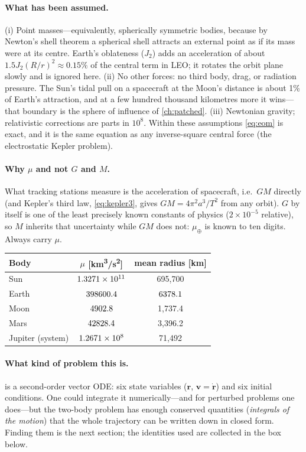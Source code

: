 \documentclass[11pt,letterpaper,oneside]{report}
\newcommand{\bv}[1]{\bm{#1}}
\begin{document}
\paragraph{What has been assumed.} (i) Point masses---equivalently, spherically symmetric bodies,
because by Newton's shell theorem a spherical shell attracts an external point as if its mass were
at its centre. Earth's oblateness ($J_2$) adds an acceleration of about $1.5J_2(R/r)^2\approx0.15\%$
of the central term in LEO; it rotates the orbit plane slowly and is ignored here. (ii) No other
forces: no third body, drag, or radiation pressure. The Sun's tidal pull on a spacecraft at the
Moon's distance is about 1\% of Earth's attraction, and at a few hundred thousand kilometres more
it wins---that boundary is the sphere of influence of \cref{ch:patched}. (iii) Newtonian gravity;
relativistic corrections are parts in $10^8$. Within these assumptions \cref{eq:eom} is exact, and
it is the same equation as any inverse-square central force (the electrostatic Kepler problem).

\paragraph{Why $\mu$ and not $G$ and $M$.} What tracking stations measure is the acceleration of
spacecraft, i.e.\ $GM$ directly (and Kepler's third law, \cref{eq:kepler3}, gives $GM=4\pi^2a^3/T^2$
from any orbit). $G$ by itself is one of the least precisely known constants of physics
($2\times10^{-5}$ relative), so $M$ inherits that uncertainty while $GM$ does not: $\mu_\oplus$ is
known to ten digits. Always carry $\mu$.

\begin{center}\small
\begin{tabular}{lcc}\toprule
Body & $\mu$ [\si{km^3/s^2}] & mean radius [km] \\\midrule
Sun & $\num{1.3271e+11}$ & 695,700 \\
Earth & $398600.4$ & $6378.1$ \\
Moon & $4902.8$ & 1,737.4 \\
Mars & $42828.4$ & 3,396.2 \\
Jupiter (system) & $\num{1.2671e+08}$ & 71,492 \\\bottomrule
\end{tabular}
\end{center}

\paragraph{What kind of problem this is.}  is a second-order vector ODE: six state
variables ($\bv r$, $\bv v=\dot{\bv r}$) and six initial conditions. One could integrate it
numerically---and for perturbed problems one does---but the two-body problem has enough
conserved quantities (\emph{integrals of the motion}) that the whole trajectory can be written
down in closed form. Finding them is the next section; the identities used are collected in the
box below.
\end{document}
